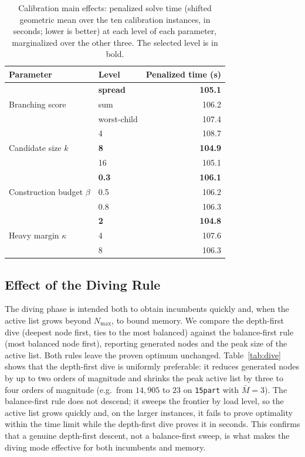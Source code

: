 \documentclass[review,3p,times,authoryear]{elsarticle}
\begin{document}
\begin{table}[t]
	\centering
	\caption{Calibration main effects: penalized solve time (shifted geometric mean
		over the ten calibration instances, in seconds; lower is better) at each level
		of each parameter, marginalized over the other three. The selected level is in
		bold.}
	\label{tab:calib}
	\small
	\begin{tabular}{l l r}
		\toprule
		Parameter & Level & Penalized time (s) \\
		\midrule
		\multirow{3}{*}{Branching score} & \textbf{spread} & \textbf{105.1} \\
		& sum & 106.2 \\
		& worst-child & 107.4 \\
		\midrule
		\multirow{3}{*}{Candidate size $k$} & 4 & 108.7 \\
		& \textbf{8} & \textbf{104.9} \\
		& 16 & 105.1 \\
		\midrule
		\multirow{3}{*}{Construction budget $\beta$} & \textbf{0.3} & \textbf{106.1} \\
		& 0.5 & 106.2 \\
		& 0.8 & 106.3 \\
		\midrule
		\multirow{3}{*}{Heavy margin $\kappa$} & \textbf{2} & \textbf{104.8} \\
		& 4 & 107.6 \\
		& 8 & 106.3 \\
		\bottomrule
	\end{tabular}
\end{table}

\subsection{Effect of the Diving Rule}
\label{subsec:res_dive}

The diving phase is intended both to obtain incumbents quickly and, when the
active list grows beyond $N_{\max}$, to bound memory. We compare the depth-first
dive (deepest node first, ties to the most balanced) against the balance-first
rule (most balanced node first), reporting generated nodes and the peak size of
the active list. Both rules leave the proven optimum unchanged.
Table~\ref{tab:dive} shows that the depth-first dive is uniformly preferable: it
reduces generated nodes by up to two orders of magnitude and shrinks the peak
active list by three to four orders of magnitude (e.g.\ from $14{,}905$ to $23$
on \texttt{15part} with $\bar M=3$). The balance-first rule does not descend; it
sweeps the frontier by load level, so the active list grows quickly and, on the
larger instances, it fails to prove optimality within the time limit while the
depth-first dive proves it in seconds. This confirms that a genuine depth-first
descent, not a balance-first sweep, is what makes the diving mode effective for
both incumbents and memory.
\end{document}
